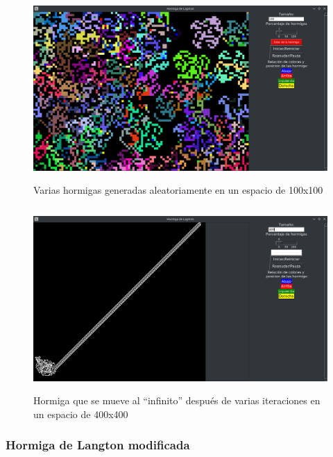 \begin{figure}[H]
\begin{center}
 \includegraphics[width=12cm, height=7cm]{img/original2.png}
 \caption{Varias hormigas generadas aleatoriamente en un espacio de 100x100}
 \label{fig:origina2}
\end{center}
\end{figure}

\begin{figure}[H]
\begin{center}
 \includegraphics[width=12cm, height=7cm]{img/original3.png}
 \caption{Hormiga que se mueve al ``infinito'' después de varias iteraciones en un espacio de 400x400}
 \label{fig:original3}
\end{center}
\end{figure}

\subsubsection{Hormiga de Langton modificada}

